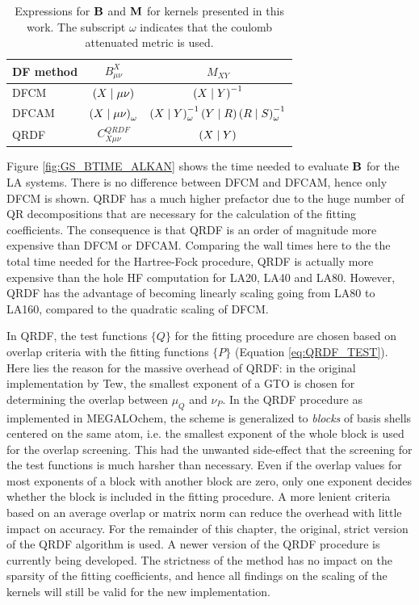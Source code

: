 \begin{table}
\centering
\begin{tabular}{lcc}
\hline
DF method & $B^X_{\mu\nu}$ & $M_{XY}$ \\
\hline
DFCM & $\left( X \mid \mu\nu \right)$ &  $\left( X \mid Y \right)^{-1}$ \\
DFCAM & $\left( X \mid \mu\nu \right)_{\omega}$ & $\left( X \mid Y \right)_{\omega}^{-1} \left( Y \mid R \right) \left( R \mid S \right)_{\omega}^{-1}$ \\
QRDF & $C^{QRDF}_{X\mu\nu}$ & $\left( X \mid Y \right)$ \\ 
\hline
\end{tabular}
\label{tab:BMTENSORS}
\caption{Expressions for $\mathbf{B}$ and $\mathbf{M}$ for kernels presented in this work. The subscript $\omega$ indicates that the coulomb attenuated metric is used.}
\end{table}

Figure \ref{fig:GS_BTIME_ALKAN} shows the time needed to evaluate $\mathbf{B}$ for the LA systems. There is no difference between DFCM and DFCAM, hence only DFCM is shown. QRDF has a much higher prefactor due to the huge number of QR decompositions that are necessary for the calculation of the fitting coefficients. The consequence is that QRDF is an order of magnitude more expensive than DFCM or DFCAM. Comparing the wall times here to the the total time needed for the Hartree-Fock procedure, QRDF is actually more expensive than the hole HF computation for LA20, LA40 and LA80. However, QRDF has the advantage of becoming linearly scaling going from LA80 to LA160, compared to the quadratic scaling of DFCM.  

In QRDF, the test functions $\{Q\}$ for the fitting procedure are chosen based on overlap criteria with the fitting functions $\{P\}$ (Equation \ref{eq:QRDF_TEST}). Here lies the reason for the massive overhead of QRDF: in the original implementation by Tew, the smallest exponent of a GTO is chosen for determining the overlap between $\mu_Q$ and $\nu_P$. In the QRDF procedure as implemented in MEGALOchem, the scheme is generalized to \emph{blocks} of basis shells centered on the same atom, i.e. the smallest exponent of the whole block is used for the overlap screening. This had the unwanted side-effect that the screening for the test functions is much harsher than necessary. Even if the overlap values for most exponents of a block with another block are zero, only one exponent decides whether the block is included in the fitting procedure. A more lenient criteria based on an average overlap or matrix norm can reduce the overhead with little impact on accuracy. For the remainder of this chapter, the original, strict version of the QRDF algorithm is used. A newer version of the QRDF procedure is currently being developed. The strictness of the method has no impact on the sparsity of the fitting coefficients, and hence all findings on the scaling of the kernels will still be valid for the new implementation.

